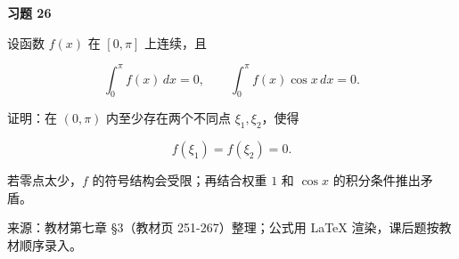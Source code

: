 \begin{exercisebox}
\textbf{习题 26 }

设函数 \(f(x)\) 在 \([0,\pi]\) 上连续，且

\[
      \int_0^\pi f(x)\,dx=0,\qquad
      \int_0^\pi f(x)\cos x\,dx=0.
      \]

证明：在 \((0,\pi)\) 内至少存在两个不同点 \(\xi_1,\xi_2\)，使得

\[
      f(\xi_1)=f(\xi_2)=0.
      \]

\begin{hintbox}
若零点太少，\(f\) 的符号结构会受限；再结合权重 \(1\) 和 \(\cos x\) 的积分条件推出矛盾。
\end{hintbox}
\end{exercisebox}

来源：教材第七章 §3（教材页 251-267）整理；公式用 LaTeX 渲染，课后题按教材顺序录入。
